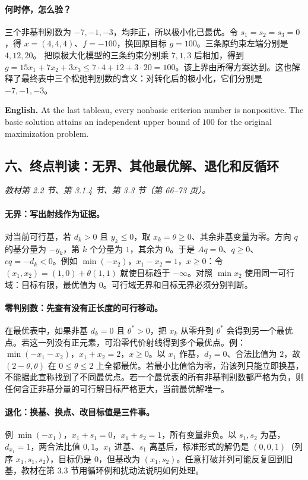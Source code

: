 \documentclass[UTF8,11pt,a4paper]{ctexart}
\newcommand{\EN}[1]{\par\noindent \textbf{English.} #1\par}
\begin{document}
\paragraph{何时停，怎么验？}
三个非基判别数为 $-7,-1,-3$，均非正，所以极小化已最优。令 $s_1=s_2=s_3=0$，得 $x=(4,4,4)$、$f=-100$，换回原目标 $g=100$。三条原约束左端分别是 $4,12,20$。
把原极大化模型的三条约束分别乘 $7,1,3$ 后相加，得到 $g=15x_1+7x_2+3x_3\le7\cdot4+12+3\cdot20=100$。该上界由所得方案达到。这也解释了最终表中三个松弛判别数的含义：对转化后的极小化，它们分别是 $-7,-1,-3$。
\EN{At the last tableau, every nonbasic criterion number is nonpositive. The basic solution attains an independent upper bound of $100$ for the original maximization problem.}

\clearpage
\subsection*{六、终点判读：无界、其他最优解、退化和反循环}
\noindent\textit{教材第 2.2 节、第 3.1.4 节、第 3.3 节（第 66--73 页）。}
\paragraph{无界：写出射线作为证据。}
对当前可行基，若 $d_k>0$ 且 $y_k\le0$，取 $x_k=\theta\ge0$、其余非基变量为零。方向 $q$ 的基分量为 $-y_k$，第 $k$ 个分量为 $1$，其余为 $0$。于是 $Aq=0$、$q\ge0$、$cq=-d_k<0$。例如 $\min(-x_2)$，$x_1-x_2=1$，$x\ge0$：令 $(x_1,x_2)=(1,0)+\theta(1,1)$ 就使目标趋于 $-\infty$。对照 $\min x_2$ 使用同一可行域：目标有限，最优值为 $0$。可行域无界和目标无界必须分别判断。

\paragraph{零判别数：先查有没有正长度的可行移动。}
在最优表中，如果非基 $d_k=0$ 且 $\theta^*>0$，把 $x_k$ 从零升到 $\theta^*$ 会得到另一个最优点。若这一列没有正元素，可沿零代价射线得到多个最优点。例：$\min(-x_1-x_2)$，$x_1+x_2=2$，$x\ge0$。以 $x_1$ 作基，$d_2=0$、合法比值为 $2$，故 $(2-\theta,\theta)$ 在 $0\le\theta\le2$ 上全都最优。若最小比值恰为零，沿该列只能立即换基，不能据此宣称找到了不同最优点。若一个最优表的所有非基判别数都严格为负，则任何含正非基分量的可行解目标严格更大，当前最优解唯一。

\paragraph{退化：换基、换点、改目标值是三件事。}
例 $\min(-x_1)$，$x_1+s_1=0$，$x_1+s_2=1$，所有变量非负。以 $s_1,s_2$ 为基，$d_{x_1}=1$，两合法比值 $0,1$。$x_1$ 进基、$s_1$ 离基后，标准形式的解仍是 $(0,0,1)$（列序 $x_1,s_1,s_2$），目标仍是 $0$，但基改为 $(x_1,s_2)$。任意打破并列可能反复回到旧基，教材在第 3.3 节用循环例和扰动法说明如何处理。
\end{document}
